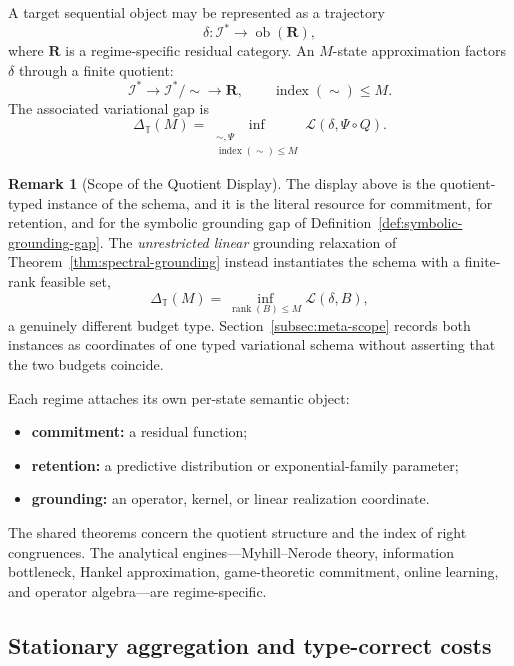 \documentclass[12pt]{article}
\theoremstyle{definition}
\newtheorem{remark}[theorem]{Remark}
\begin{document}
A target sequential object may be represented as a trajectory
\[
\delta:\mathcal I^*\to\operatorname{ob}(\mathbf R),
\]
where $\mathbf R$ is a regime-specific residual category.  An $M$-state
approximation factors $\delta$ through a finite quotient:
\[
\mathcal I^*
\longrightarrow
\mathcal I^*/\!\sim
\longrightarrow
\mathbf R,
\qquad
\operatorname{index}(\sim)\le M.
\]
The associated variational gap is
\[
\Delta_{\mathbb T}(M)
=
\inf_{\substack{\sim,\Psi\\ \operatorname{index}(\sim)\le M}}
\mathcal L(\delta,\Psi\circ Q).
\]

\begin{remark}[Scope of the Quotient Display]
\label{rem:quotient-display-scope}
The display above is the quotient-typed instance of the schema, and it is the
literal resource for commitment, for retention, and for the symbolic
grounding gap of Definition~\ref{def:symbolic-grounding-gap}.  The
\emph{unrestricted linear} grounding relaxation of
Theorem~\ref{thm:spectral-grounding} instead instantiates the schema with a
finite-rank feasible set,
\[
\Delta_{\mathbb T}(M)
=
\inf_{\operatorname{rank}(B)\le M}
\mathcal L(\delta,B),
\]
a genuinely different budget type.  Section~\ref{subsec:meta-scope} records
both instances as coordinates of one typed variational schema without
asserting that the two budgets coincide.
\end{remark}

Each regime attaches its own per-state semantic object:
\begin{itemize}[nosep]
\item \textbf{commitment:} a residual function;
\item \textbf{retention:} a predictive distribution or exponential-family
parameter;
\item \textbf{grounding:} an operator, kernel, or linear realization
coordinate.
\end{itemize}

The shared theorems concern the quotient structure and the index of right
congruences.  The analytical engines---Myhill--Nerode theory, information
bottleneck, Hankel approximation, game-theoretic commitment, online learning,
and operator algebra---are regime-specific.

\subsection{Stationary aggregation and type-correct costs}
\label{subsec:stationary-intro}
\end{document}
